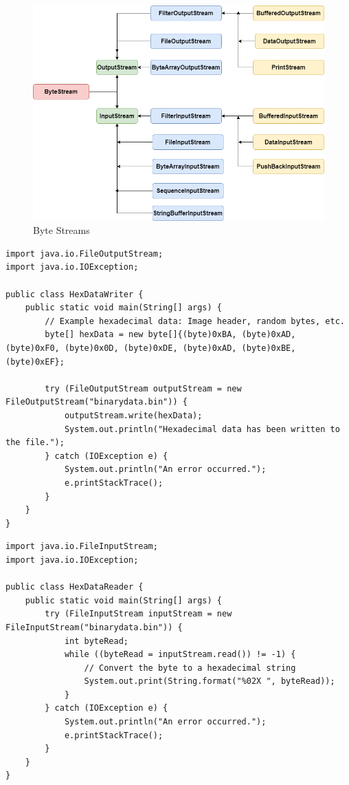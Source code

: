 \begin{figure}[H]
  \includegraphics[width=\linewidth]{images/chapter_files/byte_stream_classes.png}
  \caption{Byte Streams}
  \label{fig:paths}
\end{figure}


\begin{lstlisting}
import java.io.FileOutputStream;
import java.io.IOException;

public class HexDataWriter {
    public static void main(String[] args) {
        // Example hexadecimal data: Image header, random bytes, etc.
        byte[] hexData = new byte[]{(byte)0xBA, (byte)0xAD, (byte)0xF0, (byte)0x0D, (byte)0xDE, (byte)0xAD, (byte)0xBE, (byte)0xEF};

        try (FileOutputStream outputStream = new FileOutputStream("binarydata.bin")) {
            outputStream.write(hexData);
            System.out.println("Hexadecimal data has been written to the file.");
        } catch (IOException e) {
            System.out.println("An error occurred.");
            e.printStackTrace();
        }
    }
}
\end{lstlisting}


\begin{lstlisting}
import java.io.FileInputStream;
import java.io.IOException;

public class HexDataReader {
    public static void main(String[] args) {
        try (FileInputStream inputStream = new FileInputStream("binarydata.bin")) {
            int byteRead;
            while ((byteRead = inputStream.read()) != -1) {
                // Convert the byte to a hexadecimal string
                System.out.print(String.format("%02X ", byteRead));
            }
        } catch (IOException e) {
            System.out.println("An error occurred.");
            e.printStackTrace();
        }
    }
}
\end{lstlisting}


